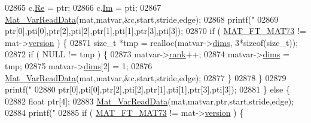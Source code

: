 \begin{DoxyCode}
{{{{{{{{{{{{02865                         c.\hyperlink{group___m_a_t_a484a93607508adac2bce53a0252e0325}{Re} = ptr;
02866                         c.\hyperlink{group___m_a_t_a7182d10b0d3598415887376065440946}{Im} = pti;
02867                         \hyperlink{group___m_a_t_ga1845000f4fc6252ec5ff11c4b9f0759f}{Mat\_VarReadData}(mat,matvar,&c,start,stride,edge);
02868                         printf(\textcolor{stringliteral}{"%
02869                             ptr[0],pti[0],ptr[2],pti[2],ptr[1],pti[1],ptr[3],pti[3]);
02870                         \textcolor{keywordflow}{if} ( \hyperlink{group___m_a_t_ggad03442b8378999189d510e3745c702b7a765c5d1d5038947646260dc82483517e}{MAT\_FT\_MAT73} != mat->\hyperlink{struct__mat__t_a729c2bc0afc97485057a5af425635b1a}{version} ) \{
02871                             \textcolor{keywordtype}{size\_t} *tmp = realloc(matvar->\hyperlink{group___m_a_t_a8e01234e1c862ce3472bb37f5a09b92c}{dims}, 3*\textcolor{keyword}{sizeof}(\textcolor{keywordtype}{size\_t}));
02872                             \textcolor{keywordflow}{if} ( NULL != tmp ) \{
02873                                 matvar->\hyperlink{group___m_a_t_a84ba70c96ded13cc555fa75b768d9921}{rank}++;
02874                                 matvar->\hyperlink{group___m_a_t_a8e01234e1c862ce3472bb37f5a09b92c}{dims} = tmp;
02875                                 matvar->\hyperlink{group___m_a_t_a8e01234e1c862ce3472bb37f5a09b92c}{dims}[2] = 1;
02876                                 \hyperlink{group___m_a_t_ga1845000f4fc6252ec5ff11c4b9f0759f}{Mat\_VarReadData}(mat,matvar,&c,start,stride,edge);
02877                             \}
02878                         \}
02879                         printf(\textcolor{stringliteral}{"%
02880                             ptr[0],pti[0],ptr[2],pti[2],ptr[1],pti[1],ptr[3],pti[3]);
02881                     \} \textcolor{keywordflow}{else} \{
02882                         \textcolor{keywordtype}{float} ptr[4];
02883                         \hyperlink{group___m_a_t_ga1845000f4fc6252ec5ff11c4b9f0759f}{Mat\_VarReadData}(mat,matvar,ptr,start,stride,edge);
02884                         printf(\textcolor{stringliteral}{"%
02885                         \textcolor{keywordflow}{if} ( \hyperlink{group___m_a_t_ggad03442b8378999189d510e3745c702b7a765c5d1d5038947646260dc82483517e}{MAT\_FT\_MAT73} != mat->\hyperlink{struct__mat__t_a729c2bc0afc97485057a5af425635b1a}{version} ) \{
}}}}}}}}}}}}}}}
\end{DoxyCode}
